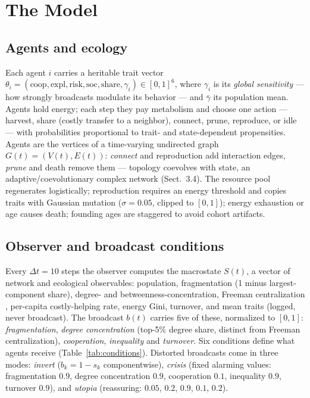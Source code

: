 \documentclass{svproc}
\begin{document}
\section{The Model}
\subsection{Agents and ecology}
Each agent $i$ carries a heritable trait vector
$\theta_i=(\mathrm{coop},\mathrm{expl},\mathrm{risk},\mathrm{soc},
\mathrm{share},\gamma_i)\in[0,1]^6$, where $\gamma_i$ is its
\emph{global sensitivity} --- how strongly broadcasts modulate its behavior ---
and $\bar\gamma$ its population mean.
Agents hold energy; each step they pay metabolism and choose one action ---
harvest, share (costly transfer to a neighbor), connect, prune, reproduce, or
idle --- with probabilities proportional to trait- and state-dependent
propensities. Agents are the vertices of a time-varying undirected graph
$G(t)=(V(t),E(t))$: \emph{connect} and reproduction add interaction edges,
\emph{prune} and death remove them --- topology coevolves with state, an
adaptive/coevolutionary complex network \cite{gross2008adaptive} (Sect.~3.4). The resource pool regenerates logistically; reproduction requires an energy
threshold and copies traits with Gaussian mutation ($\sigma=0.05$, clipped
to $[0,1]$); energy
exhaustion or age causes death; founding ages are staggered to avoid cohort
artifacts.

\subsection{Observer and broadcast conditions}
Every $\Delta t=10$ steps the observer computes the macrostate $S(t)$, a
vector of network and ecological observables:
population, fragmentation (1 minus largest-component share), degree- and
betweenness-concentration, Freeman centralization \cite{freeman1978centrality},
per-capita costly-helping rate, energy Gini, turnover, and mean traits (logged,
never broadcast). The broadcast $b(t)$ carries five of these, normalized to
$[0,1]$: \emph{fragmentation}, \emph{degree concentration} (top-5\% degree
share, distinct from Freeman centralization), \emph{cooperation},
\emph{inequality} and \emph{turnover}. Six conditions
define what agents receive (Table~\ref{tab:conditions}). Distorted broadcasts come in three modes:
\emph{invert} ($b_k = 1-s_k$ componentwise), \emph{crisis} (fixed alarming
values: fragmentation $0.9$, degree concentration $0.9$, cooperation $0.1$,
inequality $0.9$, turnover $0.9$), and \emph{utopia} (reassuring: $0.05$,
$0.2$, $0.9$, $0.1$, $0.2$).
\end{document}
